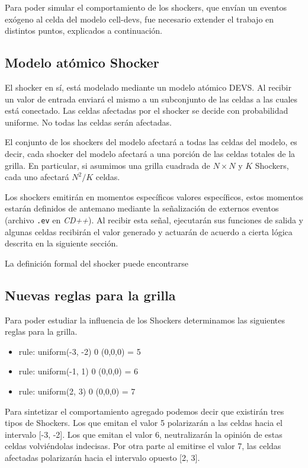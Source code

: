 Para poder simular el comportamiento de los shockers, que envían un eventos exógeno al celda del modelo cell-devs, fue necesario extender el trabajo en distintos puntos, explicados a continuación.

\subsection{Modelo atómico Shocker}

El shocker en sí, está modelado mediante un modelo atómico DEVS. Al recibir un valor de entrada enviará el mismo a un subconjunto de las celdas a las cuales está conectado. Las celdas afectadas por el shocker se decide con probabilidad uniforme. No todas las celdas serán afectadas.


El conjunto de los shockers del modelo afectará a todas las celdas del modelo, es decir, cada shocker del modelo afectará a una porción de las celdas totales de la grilla. En particular, si asumimos una grilla cuadrada de $N \times N$ y $K$ Shockers, cada uno afectará $N^2/K$ celdas.

Los shockers emitirán en momentos específicos valores específicos, estos momentos estarán definidos de antemano mediante la señalización de externos eventos (archivo \texttt{.ev} en \textit{CD++}). Al recibir esta señal, ejecutarán sus funciones de salida y algunas celdas recibirán el valor generado y actuarán de acuerdo a cierta lógica descrita en la siguiente sección.

La definición formal del shocker puede encontrarse 

\subsection{Nuevas reglas para la grilla}

Para poder estudiar la influencia de los Shockers determinamos las siguientes reglas para la grilla.

\begin{itemize}
    \item rule: {  uniform(-3, -2) } 0 { (0,0,0) = 5 }
    \item rule: {  uniform(-1, 1)  } 0 { (0,0,0) = 6 }
    \item rule: {  uniform(2, 3) } 0 { (0,0,0) = 7 } 
\end{itemize}

Para sintetizar el comportamiento agregado podemos decir que existirán tres tipos de Shockers. Los que emitan el valor 5 polarizarán a las celdas hacia el intervalo [-3, -2]. Los que emitan el valor 6, neutralizarán la opinión de estas celdas volviéndolas indecisas. Por otra parte al emitirse el valor 7, las celdas afectadas polarizarán hacia el intervalo opuesto [2, 3].


